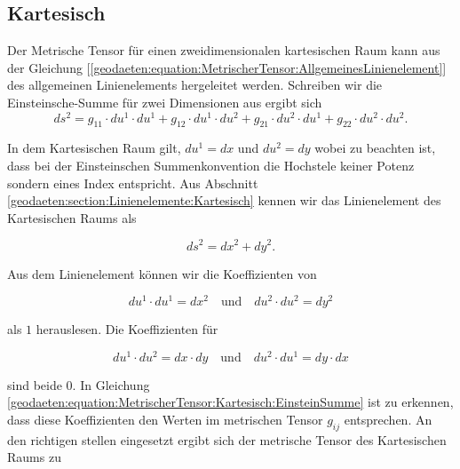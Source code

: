 %
%
%
%
\usepackage{xcolor}
\subsection{Kartesisch\label{geodaeten:section:MetrischerTensor:Kartesisch}}

Der Metrische Tensor für einen zweidimensionalen kartesischen Raum kann aus der Gleichung [\ref{geodaeten:equation:MetrischerTensor:AllgemeinesLinienelement}] des allgemeinen Linienelements hergeleitet werden.
Schreiben wir die Einsteinsche-Summe für zwei Dimensionen aus ergibt sich
\begin{equation}
	ds^2 = g_{11} \cdot du^1 \cdot du^1 + g_{12} \cdot du^1 \cdot du^2 + g_{21} \cdot du^2 \cdot du^1 + g_{22} \cdot du^2 \cdot du^2 .
	\label{geodaeten:equation:MetrischerTensor:Kartesisch:EinsteinSumme}
\end{equation}

In dem Kartesischen Raum gilt, $du^1 = dx$ und $du^2 = dy$ wobei zu beachten ist, dass bei der Einsteinschen Summenkonvention die Hochstele keiner Potenz sondern eines Index entspricht.
Aus Abschnitt \ref{geodaeten:section:Linienelemente:Kartesisch} kennen wir das Linienelement des Kartesischen Raums als

\begin{equation}
	ds^2 = dx^2 + dy^2 .
\end{equation}

Aus dem Linienelement können wir die Koeffizienten von 

\begin{equation}
du^1 \cdot du^1 = dx^2 \quad \text{und} \quad du^2 \cdot du^2 = dy^2 
\end{equation}

als $1$ herauslesen.
Die Koeffizienten für

\begin{equation}
du^1 \cdot du^2 = dx \cdot dy \quad \text{und} \quad du^2 \cdot du^1 = dy \cdot dx
\end{equation}

sind beide $0$.
In Gleichung \ref{geodaeten:equation:MetrischerTensor:Kartesisch:EinsteinSumme} ist zu erkennen, dass diese Koeffizienten den Werten im metrischen Tensor $g_{ij}$ entsprechen.
An den richtigen stellen eingesetzt ergibt sich der metrische Tensor des Kartesischen Raums zu

